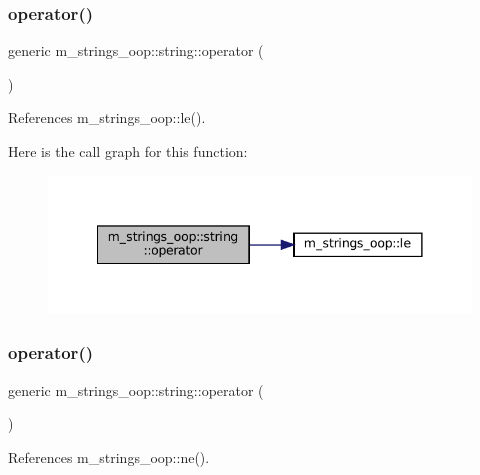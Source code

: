 \subsubsection{\texorpdfstring{operator()}{operator()}\hspace{0.1cm}{\footnotesize\ttfamily [5/10]}}
{\footnotesize\ttfamily generic m\+\_\+strings\+\_\+oop\+::string\+::operator (\begin{DoxyParamCaption}{ }\end{DoxyParamCaption})\hspace{0.3cm}{\ttfamily [private]}}



References m\+\_\+strings\+\_\+oop\+::le().

Here is the call graph for this function\+:\nopagebreak
\begin{figure}[H]
\begin{center}
\leavevmode
\includegraphics[width=341pt]{structm__strings__oop_1_1string_ac18c4ae9c5afc0f832e18718a03dedab_cgraph}
\end{center}
\end{figure}
\mbox{\label{structm__strings__oop_1_1string_a1e081318a04d087b5482edb5ef33ad20}} 
\subsubsection{\texorpdfstring{operator()}{operator()}\hspace{0.1cm}{\footnotesize\ttfamily [6/10]}}
{\footnotesize\ttfamily generic m\+\_\+strings\+\_\+oop\+::string\+::operator (\begin{DoxyParamCaption}{ }\end{DoxyParamCaption})\hspace{0.3cm}{\ttfamily [private]}}



References m\+\_\+strings\+\_\+oop\+::ne().


